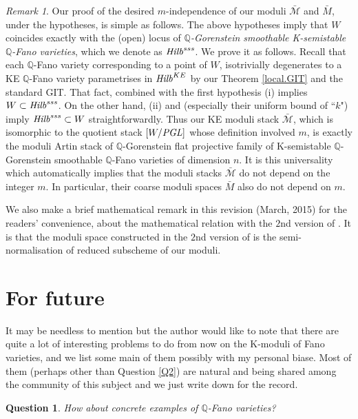 \documentclass[12pt]{amsart}
\newtheorem{Ques}{Question}
\theoremstyle{remark}
\newtheorem{Rem}[Thm]{Remark}
\theoremstyle{definition}
\begin{document}
\begin{Rem}
Our proof of the desired 
$m$-independence of our moduli $\bar{\mathcal{M}}$ and $\bar{M}$, under the 
hypotheses, is simple as follows. 
The above hypotheses 
imply that $W$ coincides exactly with the (open) locus of 
\textit{$\mathbb{Q}$-Gorenstein smoothable 
K-semistable $\mathbb{Q}$-Fano varieties}, 
which we denote as ${\it Hilb}^{sss}$. We prove it as follows. 
Recall that each $\mathbb{Q}$-Fano variety 
corresponding to a point of $W$, isotrivially degenerates to a KE $\mathbb{Q}$-Fano variety 
parametrises in ${\it Hilb}^{KE}$ by our Theorem \ref{local.GIT} and the standard GIT. 
That fact, combined with the first hypothesis (i) implies $W\subset {\it Hilb}^{sss}$. 
On the other hand, (ii) and \cite{DS} (especially their uniform bound of ``$k$") 
imply ${\it Hilb}^{sss}\subset W$ straightforwardly. Thus 
our KE moduli stack $\bar{\mathcal{M}}$, which is isomorphic to the quotient stack $[W/{\it PGL}]$ whose definition involved $m$, is exactly the moduli Artin stack of $\mathbb{Q}$-Gorenstein flat projective family of 
K-semistable $\mathbb{Q}$-Gorenstein smoothable $\mathbb{Q}$-Fano varieties of dimension $n
$. It is this universality which automatically implies that the moduli stacks 
$\bar{\mathcal{M}}$ do not depend 
on the integer $m$. In particular, their 
coarse moduli spaces $\bar{M}$ also do not depend on $m$. 
 
We also make a brief mathematical remark in this revision (March, 2015) for the readers'  
convenience, about the mathematical relation with the $2$nd version of \cite{LWX}. 
It is that the moduli space constructed in the 
$2$nd version of \cite{LWX} is the semi-normalisation of reduced subscheme of our moduli. 
\end{Rem}

\section{For future}

It may be needless to mention but 
the author would like to note that there are quite a lot of interesting 
problems to do 
from now on the K-moduli of Fano varieties, and we list some main of them possibly 
with my personal biase. 
Most of them (perhaps other than Question \ref{Q2}) are natural and 
being shared among the community of this subject and we just write down for the 
record. 

\begin{Ques}\label{Q1}
How about \textit{concrete} examples of $\mathbb{Q}$-Fano varieties? 
\end{Ques}
\end{document}
